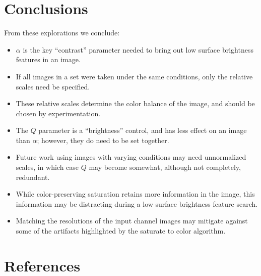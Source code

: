 \documentclass[letterpaper, 11pt]{article}
\begin{document}
\section{Conclusions}
\label{sec:color}

From these explorations we conclude:
\begin{itemize}
\item $\alpha$ is the key ``contrast'' parameter needed to bring out low
surface brightness features in an image.
\item If all images in a set were taken under the same conditions, only the
relative scales need be specified.
\item These relative scales determine the color balance of the image, and
should be chosen by experimentation.
\item The $Q$ parameter is a ``brightness'' control, and has less effect on an
image than $\alpha$; however, they do need to be set together.
\item Future work using images with varying conditions may need unnormalized
scales, in which case $Q$ may become somewhat, although not completely, 
redundant.
\item While color-preserving saturation retains more information in the image,
this information may be distracting during a low surface brightness feature
search.
\item Matching the resolutions of the input channel images may mitigate
against some of the artifacts highlighted by the saturate to color algorithm.
\end{itemize}


\section{References}



\end{document}
